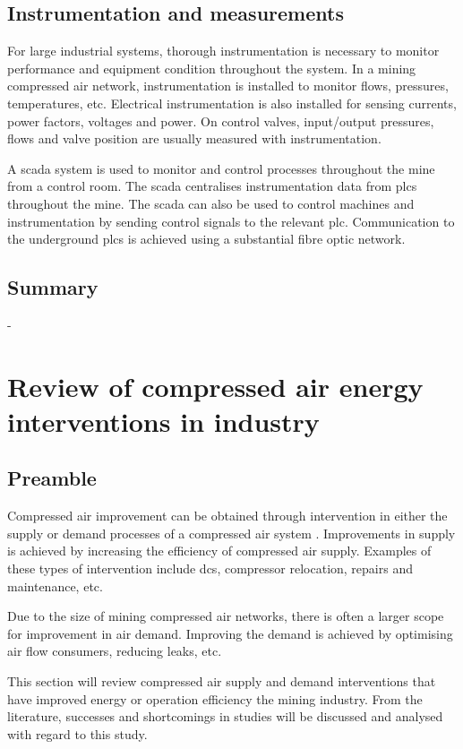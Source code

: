 \subsection{Instrumentation and measurements}
For large industrial systems, thorough instrumentation is necessary to monitor performance and equipment condition throughout the system. In a mining compressed air network, instrumentation is installed to monitor flows, pressures, temperatures, etc. Electrical instrumentation is also installed for sensing currents, power factors, voltages and power. On control valves, input/output pressures, flows and valve position are usually measured with instrumentation.	
\par
A \gls{scada} system is used to monitor and control processes throughout the mine from a control room. The \gls{scada} centralises instrumentation data from \glspl{plc} throughout the mine. The \gls{scada} can also be used to control machines and instrumentation by sending control signals to the relevant \gls{plc}.  Communication to the underground \glspl{plc} is achieved using a substantial fibre optic network\cite{schroeder2009energy}.
\subsection{Summary}-
\section{Review of compressed air energy interventions in industry}
	\subsection{Preamble}
		Compressed air improvement can be obtained through intervention in either the supply or demand processes of a compressed air system \cite{Kriel2014Masters}. Improvements in supply is achieved by increasing the efficiency of compressed air supply. Examples of these types of intervention include \gls{dcs}, compressor relocation, repairs and maintenance, etc. 
		\par
		Due to the size of mining compressed air networks, there is often a larger scope for improvement in air demand. Improving the demand is achieved by optimising air flow consumers, reducing leaks, etc.
		\par
	 	 This section will review compressed air supply and demand interventions that have improved energy or operation efficiency the mining industry. From the literature, successes and shortcomings in studies will be discussed and analysed with regard to this study.
	 	
